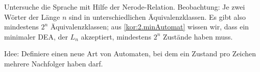 Untersuche die Sprache mit Hilfe der Nerode-Relation.
Beobachtung: Je zwei Wörter der Länge $n$ sind in unterschiedlichen Äquivalenzklassen.
Es gibt also mindestens $2^n$ Äquivalenzklassen; aus \autoref{kor:2.minAutomat} wissen wir, dass ein minimaler \acs*{DEA}, der $L_n$ akzeptiert, mindestens $2^n$ Zustände haben muss.

Idee: Definiere einen neue Art von Automaten, bei dem ein Zustand pro Zeichen mehrere Nachfolger haben darf.

% 	
